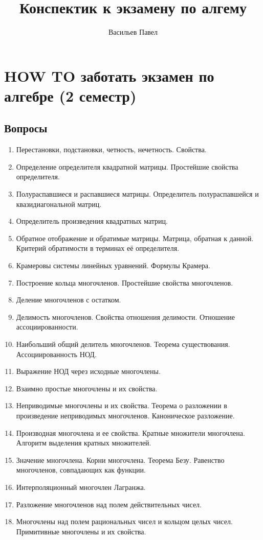 \documentclass[a4paper]{article}
\title{Конспектик к экзамену по алгему}
\author{Васильев Павел}
\begin{document}
\section*{HOW TO заботать экзамен по алгебре (2 семестр)}

\subsection*{Вопросы}

\begin{enumerate}
\item Перестановки, подстановки, четность, нечетность. Свойства. 
\item Определение определителя квадратной матрицы. Простейшие свойства определителя. 
\item Полураспавшиеся и распавшиеся матрицы. Определитель полураспавшейся и квазидиагональной матриц.
\item Определитель произведения квадратных матриц.
\item Обратное отображение и обратимые матрицы. Матрица, обратная к данной. Критерий обратимости в терминах её определителя.
\item Крамеровы системы линейных уравнений. Формулы Крамера.
\item Построение кольца многочленов. Простейшие свойства многочленов.
\item Деление многочленов с остатком.
\item Делимость многочленов. Свойства отношения делимости. Отношение ассоциированности.
\item Наибольший общий делитель многочленов. Теорема существования. Ассоциированность НОД. 
\item Выражение НОД через исходные многочлены.
\item Взаимно простые многочлены и их свойства.
\item Неприводимые многочлены и их свойства. Теорема о разложении в произведение неприводимых многочленов. Каноническое разложение.
\item Производная многочлена и ее свойства. Кратные множители многочлена. Алгоритм выделения кратных множителей.
\item Значение многочлена. Корни многочлена. Теорема Безу. Равенство многочленов, совпадающих как функции.
\item Интерполяционный многочлен Лагранжа.
\item Разложение многочленов над полем действительных чисел.
\item Многочлены над полем рациональных чисел и кольцом целых чисел. Примитивные многочлены и их свойства.

\end{enumerate}
\end{document}
